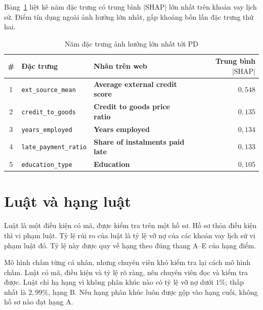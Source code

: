 \medskip

Bảng~\ref{tab:shap-top} liệt kê năm đặc trưng có trung bình $|\text{SHAP}|$ lớn nhất trên khoản vay lịch sử. Điểm tín dụng ngoài ảnh hưởng lớn nhất, gấp khoảng bốn lần đặc trưng thứ hai.

\begin{table}[H]
	\centering
	\caption{Năm đặc trưng ảnh hưởng lớn nhất tới PD}
	\label{tab:shap-top}
	\footnotesize
	\begin{tabular}{c l l r}
		\toprule
		\textbf{\#} & \textbf{Đặc trưng}            & \textbf{Nhãn trên web}                  & \textbf{Trung bình $|\text{SHAP}|$} \\
		\midrule
		1           & \texttt{ext\_source\_mean}    & \textbf{Average external credit score}  & $0{,}548$                           \\
		2           & \texttt{credit\_to\_goods}    & \textbf{Credit to goods price ratio}    & $0{,}135$                           \\
		3           & \texttt{years\_employed}      & \textbf{Years employed}                 & $0{,}134$                           \\
		4           & \texttt{late\_payment\_ratio} & \textbf{Share of instalments paid late} & $0{,}133$                           \\
		5           & \texttt{education\_type}      & \textbf{Education}                      & $0{,}105$                           \\
		\bottomrule
	\end{tabular}
\end{table}

\section{Luật và hạng luật}
\label{sec:dss-rules}

Luật là một điều kiện có mã, được kiểm tra trên một hồ sơ. Hồ sơ thỏa điều kiện thì vi phạm luật. Tỷ lệ rủi ro của luật là tỷ lệ vỡ nợ của các khoản vay lịch sử vi phạm luật đó. Tỷ lệ này được quy về hạng theo đúng thang A--E của hạng điểm.

\medskip

Mô hình chấm từng cá nhân, nhưng chuyên viên khó kiểm tra lại cách mô hình chấm. Luật có mã, điều kiện và tỷ lệ rõ ràng, nên chuyên viên đọc và kiểm tra được. Luật chỉ hạ hạng vì không phân khúc nào có tỷ lệ vỡ nợ dưới $1\%$; thấp nhất là $2{,}99\%$, hạng B. Nếu hạng phân khúc luôn được gộp vào hạng cuối, không hồ sơ nào đạt hạng A.

